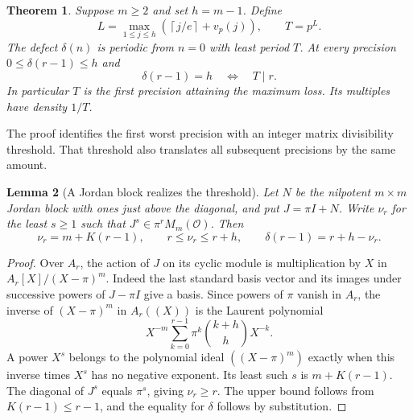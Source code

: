 \documentclass[11pt,letterpaper]{article}
\newtheorem{theorem}{Theorem}[section]
\newtheorem{lemma}[theorem]{Lemma}
\newcommand{\OO}{\mathcal O}
\begin{document}
\begin{theorem}\label{thm:period}
Suppose $m\ge2$ and set $h=m-1$. Define
\begin{equation}
 L=\max_{1\le j\le h}\left(\left\lceil j/e\right\rceil+v_p(j)\right),
 \qquad T=p^L.\label{eq:period}
\end{equation}
The defect $\delta(n)$ is periodic from $n=0$ with least period $T$. At every precision $0\le\delta(r-1)\le h$ and
\[
                   \delta(r-1)=h\quad\Longleftrightarrow\quad T\mid r .
\]
In particular $T$ is the first precision attaining the maximum loss. Its multiples have density $1/T$.
\end{theorem}

The proof identifies the first worst precision with an integer matrix divisibility threshold. That threshold also translates all subsequent precisions by the same amount.

\begin{lemma}[A Jordan block realizes the threshold]\label{lem:jordan}
Let $N$ be the nilpotent $m\times m$ Jordan block with ones just above the diagonal, and put $J=\pi I+N$. Write $\nu_r$ for the least $s\ge1$ such that $J^s\in\pi^r M_m(\OO)$. Then
\[
 \nu_r=m+K(r-1),\qquad r\le\nu_r\le r+h,
 \qquad \delta(r-1)=r+h-\nu_r.
\]
\end{lemma}
\begin{proof}
Over $A_r$, the action of $J$ on its cyclic module is multiplication by $X$ in $A_r[X]/(X-\pi)^m$. Indeed the last standard basis vector and its images under successive powers of $J-\pi I$ give a basis. Since powers of $\pi$ vanish in $A_r$, the inverse of $(X-\pi)^m$ in $A_r((X))$ is the Laurent polynomial
\[
 X^{-m}\sum_{k=0}^{r-1}\pi^k\binom{k+h}{h}X^{-k}.
\]
A power $X^s$ belongs to the polynomial ideal $((X-\pi)^m)$ exactly when this inverse times $X^s$ has no negative exponent. Its least such $s$ is $m+K(r-1)$. The diagonal of $J^s$ equals $\pi^s$, giving $\nu_r\ge r$. The upper bound follows from $K(r-1)\le r-1$, and the equality for $\delta$ follows by substitution.
\end{proof}
\end{document}
